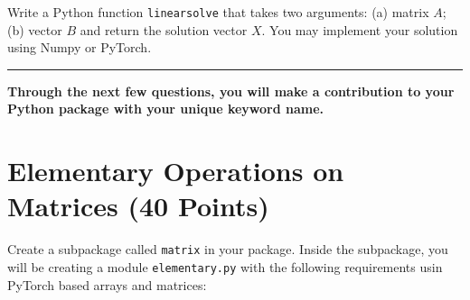 \documentclass[12pt, xcolor=dvipsnames,svgnames,x11names]{article}
\begin{document}
Write a Python function \texttt{linearsolve} that takes two arguments: (a) matrix $A$; (b) vector $B$ and return the solution vector $X$. You may implement your solution using Numpy or PyTorch.

\bigskip

\hrule

\bigskip

\textbf{Through the next few questions, you will make a contribution to your Python package with your unique keyword name.}

\section{Elementary Operations on Matrices (40 Points)}

Create a subpackage called \texttt{matrix} in your package. Inside the subpackage, you will be creating a module \texttt{elementary.py} with the following requirements usin PyTorch based arrays and matrices:
\end{document}
